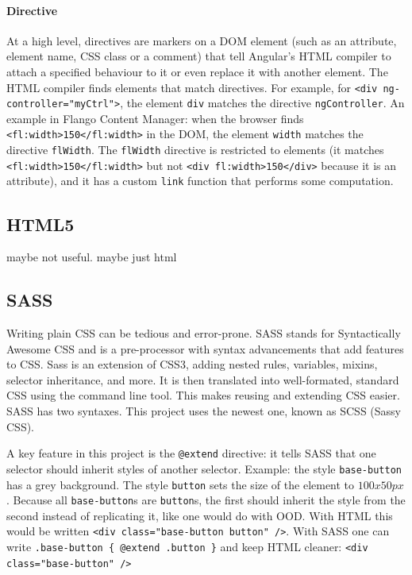 \paragraph{Directive} At a high level, directives are markers on a \ac{DOM} element (such as an attribute, element name, \ac{CSS} class or a comment) that tell Angular's \ac{HTML} compiler to attach a specified behaviour to it or even replace it with another element.
The \ac{HTML} compiler finds elements that match directives. 
For example, for \lstinline$<div ng-controller="myCtrl">$, the element \texttt{div} matches the directive \texttt{ngController}.
An example in Flango Content Manager: when the browser finds \lstinline$<fl:width>150</fl:width>$ in the \ac{DOM}, the element \texttt{width} matches the directive \texttt{flWidth}.
The \texttt{flWidth} directive is restricted to elements (it matches \lstinline$<fl:width>150</fl:width>$ but not \lstinline$<div fl:width>150</div>$ because it is an attribute), and it has a custom \texttt{link} function that performs some computation.

    
\subsection{HTML5}
maybe not useful. maybe just html

\subsection{SASS}
Writing plain \ac{CSS} can be tedious and error-prone.
SASS stands for Syntactically Awesome CSS and is a pre-processor with syntax advancements that add features to \ac{CSS}.
Sass is an extension of \ac{CSS}3, adding nested rules, variables, mixins, selector inheritance, and more.
It is then translated into well-formated, standard \ac{CSS} using the command line tool.
This makes reusing and extending \ac{CSS} easier.
SASS has two syntaxes. This project uses the newest one, known as \ac{SCSS} (Sassy CSS).

A key feature in this project is the \lstinline$@extend$ directive: it tells \ac{SASS} that one selector should inherit styles of another selector.
Example: the style \texttt{base-button} has a grey background. The style \texttt{button} sets the size of the element to $100 x 50 px$.
Because all \texttt{base-button}s are \texttt{button}s, the first should inherit the style from the second instead of replicating it, like one would do with \ac{OOD}.
With \ac{HTML} this would be written \lstinline$<div class="base-button button" />$.
With SASS one can write \lstinline$.base-button { @extend .button }$ and keep \ac{HTML} cleaner: \lstinline$<div class="base-button" />$

